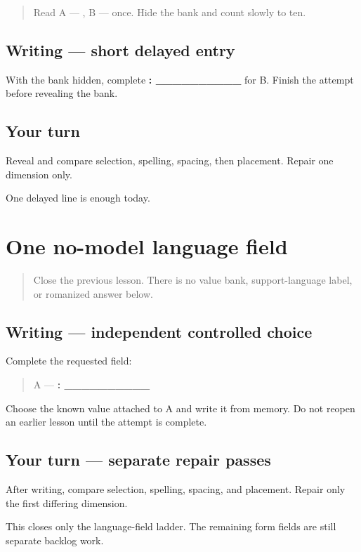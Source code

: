 \begin{quote}
Read A — \textbf{}, B — \textbf{} once. Hide the bank and count slowly to ten.
\end{quote}

\subsection*{Writing — short delayed entry}
With the bank hidden, complete \textbf{: \_\_\_\_\_\_\_\_\_\_} for B. Finish the attempt before revealing the bank.

\subsection*{Your turn}
Reveal and compare selection, spelling, spacing, then placement. Repair one dimension only.

\begin{tcolorbox}[breakable,colback=teal!4,colframe=teal!35!black,title={Before you move on}]
One delayed line is enough today.
\end{tcolorbox}
\section[\texorpdfstring{\pa{ਭਾਸ਼ਾ}: \_\_\_\_\_\_\_\_\_\_ (language field)}{ਭਾਸ਼ਾ: \_\_\_\_\_\_\_\_\_\_ (language field)}]{One no-model language field}

\label{lesson:PA-W03-language-no-model}



\begin{quote}
Close the previous lesson. There is no value bank, support-language label, or romanized answer below.
\end{quote}

\subsection*{Writing — independent controlled choice}
Complete the requested field:

\begin{quote}
A — \textbf{: \_\_\_\_\_\_\_\_\_\_}
\end{quote}

Choose the known value attached to A and write it from memory. Do not reopen an earlier lesson until the attempt is complete.

\subsection*{Your turn — separate repair passes}
After writing, compare selection, spelling, spacing, and placement. Repair only the first differing dimension.

\begin{tcolorbox}[breakable,colback=teal!4,colframe=teal!35!black,title={Before you move on}]
This closes only the language-field ladder. The remaining form fields are still separate backlog work.
\end{tcolorbox}
